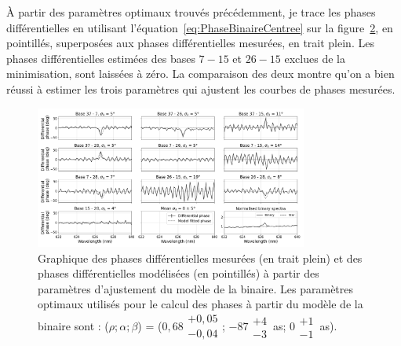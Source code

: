 \begin{figure}[ht!]
    \label{fig:PhaseDiffBin01LikeliMap}
\end{figure}

À partir des paramètres optimaux trouvés précédemment, je trace les phases différentielles en utilisant l'équation~\ref{eq:PhaseBinaireCentree} sur la figure~\ref{fig:PhaseDiffBin01LikeliFit}, en pointillés, superposées aux phases différentielles mesurées, en trait plein. Les phases différentielles estimées des bases $7-15$ et $26-15$ exclues de la minimisation, sont laissées à zéro. La comparaison des deux montre qu'on a bien réussi à estimer les trois paramètres qui ajustent les courbes de phases mesurées.

\begin{figure}[ht!]
    \centering
    \includegraphics[width=0.8\textwidth]{Figure_Chap4/20221010_Bin01_SpeDiffPhase_Calp2vm_FitLikeli_BaseSubplot_Pola1_LaTex.png}
    \caption[Graphique des phases différentielles mesurées et des phases différentielles modélisées à partir des paramètres d'ajustement du modèle de la binaire.]{Graphique des phases différentielles mesurées (en trait plein) et des phases différentielles modélisées (en pointillés) à partir des paramètres d'ajustement du modèle de la binaire. Les paramètres optimaux utilisés pour le calcul des phases à partir du modèle de la binaire sont : ($\rho; \alpha; \beta$) = ($0,68\substack{+0,05 \\ -0,04}$; $-87\substack{+4 \\ -3} \,$as; $0\substack{+1 \\ -1} \,$as).}
    \label{fig:PhaseDiffBin01LikeliFit}
\end{figure}

